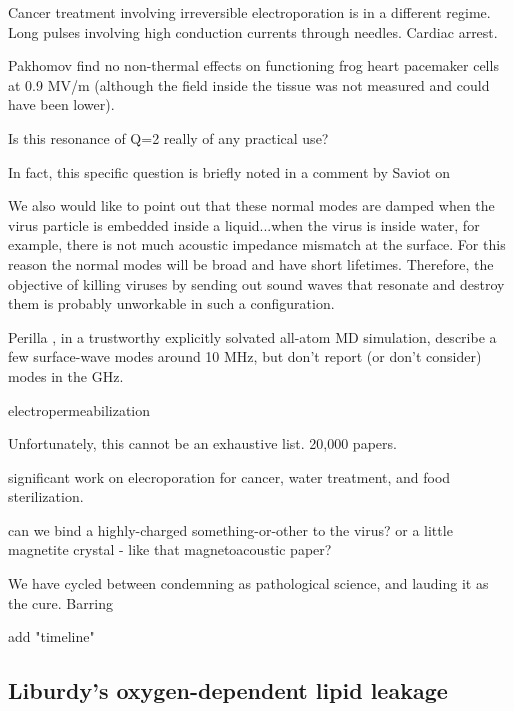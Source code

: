 \documentclass[paper.tex]{subfiles}
\begin{document}
\begin{multicols}{1}
Cancer treatment involving irreversible electroporation is in a different regime. Long pulses involving high conduction currents through needles. Cardiac arrest.



Pakhomov \cite{Comparative} find no non-thermal effects on functioning frog heart pacemaker cells at 0.9 MV/m (although the field inside the tissue was not measured and could have been lower). 


Is this resonance of Q=2 really of any practical use?


In fact, this specific question is briefly noted in a comment by Saviot \cite{Comment2004} on 


\begin{fquote}
	We also would like to point out that these normal modes are damped when the virus particle is embedded inside a liquid...when the virus is inside water, for example, there is not much acoustic impedance mismatch at the surface. For this reason the normal modes will be broad and have short lifetimes. Therefore, the objective of killing viruses by sending out sound waves that resonate and destroy them is probably unworkable in such a configuration.	
\end{fquote}




Perilla \cite{}, in a trustworthy explicitly solvated all-atom MD simulation, describe a few surface-wave modes around 10 MHz, but don't report (or don't consider) modes in the GHz.




electropermeabilization




Unfortunately, this cannot be an exhaustive list. 20,000 papers.

significant work on elecroporation for cancer, water treatment, and food sterilization.


can we bind a highly-charged something-or-other to the virus?
or a little magnetite crystal - like that magnetoacoustic paper?


We have cycled between condemning as pathological science, and lauding it as the cure. Barring 


add "timeline"



\subsection{Liburdy's oxygen-dependent lipid leakage}




\end{multicols}
\end{document}
